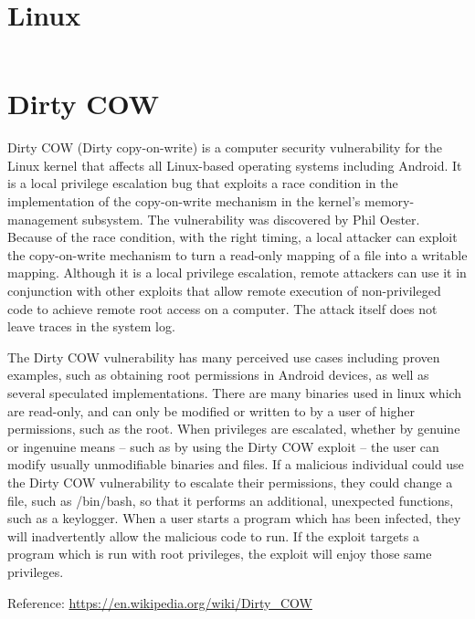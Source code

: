 \documentclass{article}
\begin{document}
\section{Linux}
\inputminted{c}{ex5.c}

\section{Dirty COW}
Dirty COW (Dirty copy-on-write) is a computer security vulnerability for the Linux kernel that affects all Linux-based operating systems including Android. It is a local privilege escalation bug that exploits a race condition in the implementation of the copy-on-write mechanism in the kernel's memory-management subsystem. The vulnerability was discovered by Phil Oester. Because of the race condition, with the right timing, a local attacker can exploit the copy-on-write mechanism to turn a read-only mapping of a file into a writable mapping. Although it is a local privilege escalation, remote attackers can use it in conjunction with other exploits that allow remote execution of non-privileged code to achieve remote root access on a computer. The attack itself does not leave traces in the system log.

The Dirty COW vulnerability has many perceived use cases including proven examples, such as obtaining root permissions in Android devices, as well as several speculated implementations. There are many binaries used in linux which are read-only, and can only be modified or written to by a user of higher permissions, such as the root. When privileges are escalated, whether by genuine or ingenuine means – such as by using the Dirty COW exploit – the user can modify usually unmodifiable binaries and files. If a malicious individual could use the Dirty COW vulnerability to escalate their permissions, they could change a file, such as /bin/bash, so that it performs an additional, unexpected functions, such as a keylogger. When a user starts a program which has been infected, they will inadvertently allow the malicious code to run. If the exploit targets a program which is run with root privileges, the exploit will enjoy those same privileges.

Reference: \url{https://en.wikipedia.org/wiki/Dirty_COW}
\end{document}
